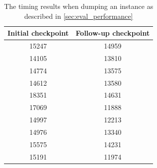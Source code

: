 \begin{table}
  \centering
  \begin{tabular}{| c | c |}
    \hline
    Initial checkpoint & Follow-up checkpoint \\
    \hline
    15247 & 14959 \\
    \hline
    14105 & 13810 \\
    \hline
    14774 & 13575 \\
    \hline
    14612 & 13580 \\
    \hline
    18351 & 14631 \\
    \hline
    17069 & 11888 \\
    \hline
    14997 & 12213 \\
    \hline
    14976 & 13340 \\
    \hline
    15575 & 14231 \\
    \hline
    15191 & 11974 \\
    \hline
  \end{tabular}
  \caption{The timing results when dumping an instance as described in \autoref{sec:eval_performance}}
  \label{tab:benchmark}
\end{table}